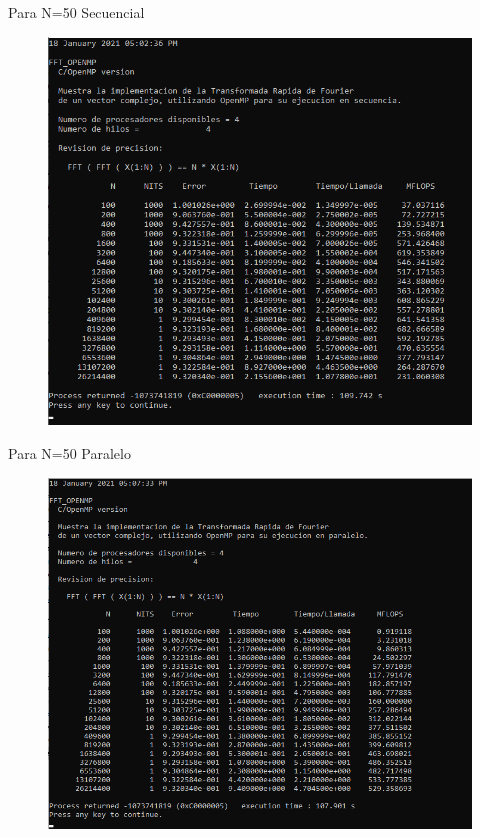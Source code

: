 \documentclass{report}
\begin{document}
\clearpage

Para N=50 Secuencial

\begin{figure}[h!]
    \centering
    \includegraphics[scale=.8]{Images/FFT_Sec_50.png}
    \label{Secuencial 1.3}
\end{figure}

\clearpage

Para N=50 Paralelo\medskip

\begin{figure}[h!]
    \centering
    \includegraphics[scale=.8]{Images/FFT_Par_50.png}
    \label{Paralelo 1.3}
\end{figure}
\end{document}
